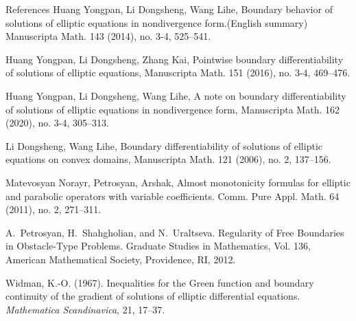 \documentclass[11pt,reqno]{amsart}
\theoremstyle{plain}
\theoremstyle{remark}
\numberwithin{equation}{section}
\begin{document}
\begin{thebibliography}{References}
Huang Yongpan, Li Dongsheng, Wang Lihe,
Boundary behavior of solutions of elliptic equations in nondivergence form.(English summary)
Manuscripta Math. 143 (2014), no. 3-4, 525–541.

Huang Yongpan, Li Dongsheng, Zhang Kai,
Pointwise boundary differentiability of solutions of elliptic equations, Manuscripta Math. 151 (2016), no. 3-4, 469–476.

Huang Yongpan, Li Dongsheng, Wang Lihe,
 A note on boundary differentiability of solutions of elliptic equations in nondivergence form,
Manuscripta Math. 162 (2020), no. 3-4, 305–313.



 Li Dongsheng, Wang Lihe,
Boundary differentiability of solutions of elliptic equations on convex domains, Manuscripta Math. 121 (2006), no. 2, 137–156.

 Matevosyan Norayr, Petrosyan, Arshak,
  Almost monotonicity formulas for elliptic and parabolic operators with variable coefficients.
Comm. Pure Appl. Math. 64 (2011), no. 2, 271–311.


A.~Petrosyan, H.~Shahgholian, and N.~Uraltseva.
\newblock Regularity of Free Boundaries in Obstacle-Type Problems.
\newblock Graduate Studies in Mathematics, Vol. 136, 
\newblock American Mathematical Society, Providence, RI, 2012.


Widman, K.-O. (1967).
\newblock Inequalities for the Green function and boundary continuity of the gradient of solutions of elliptic differential equations.
\newblock \textit{Mathematica Scandinavica}, 21, 17--37.

\end{thebibliography}





 
\end{document}
